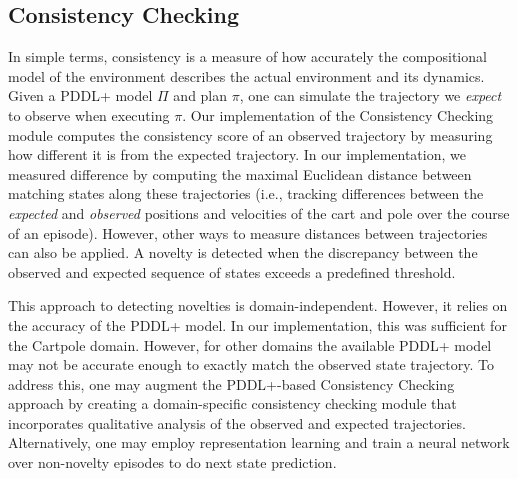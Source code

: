 \documentclass[letterpaper]{article} %
\newcommand{\sbirds}{Science Birds\xspace} %
\newcommand{\hydra}{\textsc{Hydra}\xspace} %
\begin{document}
\subsection{Consistency Checking}
In simple terms, consistency is a measure of how accurately the compositional model of the environment describes the actual environment and its dynamics.
Given a PDDL+ model $\Pi$ and plan $\pi$, one can simulate the trajectory we \emph{expect} to observe when executing $\pi$. 
Our implementation of the Consistency Checking module computes the consistency score of an observed trajectory by measuring how different it is from the expected trajectory. 
In our implementation, we measured difference by computing the maximal Euclidean distance 
between matching states along these trajectories (i.e., tracking differences between the \textit{expected} and \textit{observed} positions and velocities of the cart and pole over the course of an episode). 
However, other ways to measure distances between trajectories can also be applied. 
A novelty is detected when the discrepancy between the observed and expected sequence of states exceeds a predefined threshold. 


This approach to detecting novelties is domain-independent. 
However, it relies on the accuracy of the PDDL+ model. 
In our implementation, this was sufficient for the Cartpole domain.
However, for other domains the available PDDL+ model may not be accurate enough to exactly match the observed state trajectory.
To address this, one may augment the PDDL+-based Consistency Checking approach by creating a domain-specific consistency checking module that incorporates qualitative analysis of the observed and expected trajectories. Alternatively, one may employ representation learning and train a neural network over non-novelty episodes to do next state prediction. 
\end{document}
